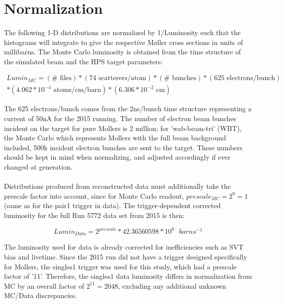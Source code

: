 \documentclass{article}
\begin{document}
\section{Normalization}
\paragraph{}
The following 1-D distributions  are normalized by 1/Luminosity such that the histograms will integrate to give the respective M\o ller cross sections in units of millibarns. The Monte Carlo luminosity is obtained from the time structure of the simulated beam and the HPS target parameters:

\begin{equation} \label{eq:MCLumin}
	\begin{split}
  	Lumin_{MC} =(\#\mbox{ files})*(\mbox{74 scatterers/atom})*(\#\mbox{ bunches})*(\mbox{625 electrons/bunch})
  	\\*(4.062*10^{-4}\mbox{ atoms/cm/barn})*(6.306*10^{-2}\mbox{ cm})
  	\end{split}
	\end{equation}

The 625 electrons/bunch comes from the 2ns/bunch time structure representing a current of 50nA for the 2015 running. The number of electron beam bunches incident on the target for pure Mollers is 2 million; for 'wab-beam-tri' (WBT), the Monte Carlo which represents Mollers with the full beam background included, 500k incident electron bunches are sent to the target. These numbers should be kept in mind when normalizing, and adjusted accordingly if ever changed at generation.

\paragraph{}
Distributions produced from reconstructed data must additionally take the prescale factor into account, since for Monte Carlo readout, $prescale_{MC}=2^0=1$ (same as for the pair1 trigger in data). The trigger-dependent corrected luminosity for the full Run 5772 data set from 2015 is then:

\begin{equation} \label{eq:DataLumin}
	Lumin_{Data} =2^{prescale}*42.36560598*10^{9}\mbox{ }barns^{-1}
	\end{equation}\newline

The luminosity used for data is already corrected for inefficiencies such as SVT bias and livetime. Since the 2015 run did not have a trigger designed specifically for Mollers, the singles1 trigger was used for this study, which had a prescale factor of  '11'. Therefore, the singles1 data luminosity differs in normalization from MC by an overall factor of $2^{11}=2048$, excluding any additional unknown MC/Data discrepancies.
\end{document}

